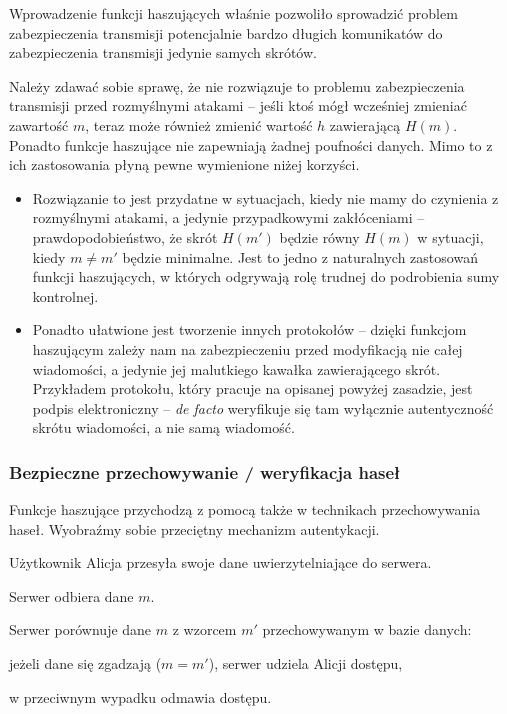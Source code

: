 \documentclass[12pt,a4paper,twoside]{article}
\begin{document}
Wprowadzenie funkcji haszujących właśnie pozwoliło sprowadzić problem
zabezpieczenia transmisji potencjalnie bardzo długich komunikatów do
zabezpieczenia transmisji jedynie samych skrótów.

Należy zdawać sobie sprawę, że nie rozwiązuje to problemu zabezpieczenia
transmisji przed rozmyślnymi atakami -- jeśli ktoś mógł wcześniej zmieniać
zawartość $m$, teraz może również zmienić wartość $h$ zawierającą $H(m)$.
Ponadto funkcje haszujące nie zapewniają żadnej poufności danych. Mimo to z ich
zastosowania płyną pewne wymienione niżej korzyści.

\begin{itemize}
\item Rozwiązanie to jest przydatne w sytuacjach, kiedy nie mamy do czynienia z
rozmyślnymi atakami, a jedynie przypadkowymi zakłóceniami --
prawdopodobieństwo, że skrót $H(m')$ będzie równy $H(m)$ w sytuacji, kiedy $m
\neq m'$ będzie minimalne. Jest to jedno z naturalnych zastosowań funkcji
haszujących, w których odgrywają rolę trudnej do podrobienia sumy kontrolnej.
\item Ponadto ułatwione jest tworzenie innych protokołów -- dzięki funkcjom
haszującym zależy nam na zabezpieczeniu przed modyfikacją nie całej wiadomości,
a jedynie jej malutkiego kawałka zawierającego skrót. Przykładem protokołu,
który pracuje na opisanej powyżej zasadzie, jest podpis elektroniczny --
\emph{de facto} weryfikuje się tam wyłącznie autentyczność skrótu wiadomości, a
nie samą wiadomość.
\end{itemize}

\subsubsection{Bezpieczne przechowywanie / weryfikacja haseł}
\label{sec:usage_password_check}
Funkcje haszujące przychodzą z pomocą także w technikach przechowywania haseł.
Wyobraźmy sobie przeciętny mechanizm autentykacji.

\begin{myenumerate}
\item Użytkownik Alicja przesyła swoje dane uwierzytelniające do serwera.
\item Serwer odbiera dane $m$.
\item Serwer porównuje dane $m$ z wzorcem $m'$ przechowywanym w bazie danych:
\label{enu:server_pass_check}
    \begin{myenumerate}
    \item jeżeli dane się zgadzają ($m = m'$), serwer udziela Alicji dostępu,
    \item w przeciwnym wypadku odmawia dostępu.
    \end{myenumerate}
\end{myenumerate}
\end{document}
